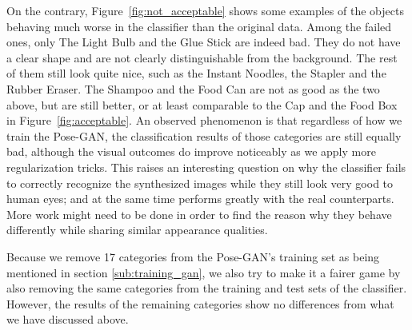 On the contrary, Figure~\ref{fig:not_acceptable} shows some examples of the objects
behaving much worse in the classifier than the original data.  Among the failed ones, only
The Light Bulb and the Glue Stick are indeed bad. They do not have a clear shape and are
not clearly distinguishable from the background. The rest of them still look quite nice,
such as the Instant Noodles, the Stapler and the Rubber Eraser. The Shampoo and the Food
Can are not as good as the two above, but are still better, or at least comparable to the
Cap and the Food Box in Figure~\ref{fig:acceptable}. An observed phenomenon is that
regardless of how we train the Pose-GAN, the classification results of those categories
are still equally bad, although the visual outcomes do improve noticeably as we apply more
regularization tricks. This raises an interesting question on why the classifier fails to
correctly recognize the synthesized images while they still look very good to human eyes;
and at the same time performs greatly with the real counterparts. More work might need to
be done in order to find the reason why they behave differently while sharing similar
appearance qualities. 

Because we remove 17 categories from the Pose-GAN's training set as being mentioned in
section \ref{sub:training_gan}, we also try to make it a fairer game by also removing the
same categories from the training and test sets of the classifier. However, the results of
the remaining categories show no differences from what we have discussed above.
